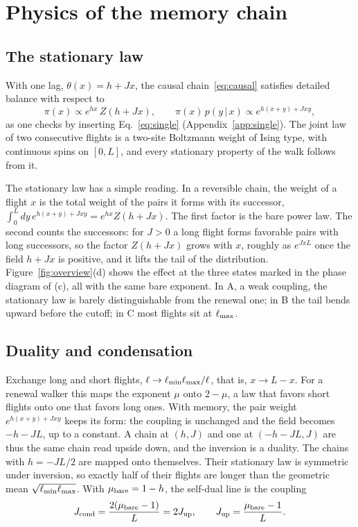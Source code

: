 \section{Physics of the memory chain}\label{sec:statmech}

\subsection{The stationary law}\label{sec:stationary}

With one lag, $\theta(x)=h+Jx$, the causal chain~\eqref{eq:causal} satisfies detailed balance with respect to
\begin{equation}
\pi(x)\propto e^{hx}\,Z(h+Jx),\qquad \pi(x)\,p(y\,|\,x)\propto e^{h(x+y)+Jxy},
\label{eq:stationary}
\end{equation}
as one checks by inserting Eq.~\eqref{eq:single} (Appendix~\ref{app:single}). The joint law of two consecutive flights is a two-site Boltzmann weight of Ising type, with continuous spins on $[0,L]$, and every stationary property of the walk follows from it.

The stationary law has a simple reading. In a reversible chain, the weight of a flight $x$ is the total weight of the pairs it forms with its successor, $\int_0^Ldy\,e^{h(x+y)+Jxy}=e^{hx}Z(h+Jx)$. The first factor is the bare power law. The second counts the successors: for $J>0$ a long flight forms favorable pairs with long successors, so the factor $Z(h+Jx)$ grows with $x$, roughly as $e^{JxL}$ once the field $h+Jx$ is positive, and it lifts the tail of the distribution. Figure~\ref{fig:overview}(d) shows the effect at the three states marked in the phase diagram of (c), all with the same bare exponent. In A, a weak coupling, the stationary law is barely distinguishable from the renewal one; in B the tail bends upward before the cutoff; in C most flights sit at $\ell_{\max}$.

\subsection{Duality and condensation}\label{sec:condensation}

Exchange long and short flights, $\ell\to\ell_{\min}\ell_{\max}/\ell$, that is, $x\to L-x$. For a renewal walker this maps the exponent $\mu$ onto $2-\mu$, a law that favors short flights onto one that favors long ones. With memory, the pair weight $e^{h(x+y)+Jxy}$ keeps its form: the coupling is unchanged and the field becomes $-h-JL$, up to a constant. A chain at $(h,J)$ and one at $(-h-JL,J)$ are thus the same chain read upside down, and the inversion is a duality. The chains with $h=-JL/2$ are mapped onto themselves. Their stationary law is symmetric under inversion, so exactly half of their flights are longer than the geometric mean $\sqrt{\ell_{\min}\ell_{\max}}$. With $\mu_{\rm bare}=1-h$, the self-dual line is the coupling
\begin{equation}
J_{\rm cond}=\frac{2(\mu_{\rm bare}-1)}{L}=2J_{\rm up},\qquad J_{\rm up}=\frac{\mu_{\rm bare}-1}{L}.
\label{eq:thresholds}
\end{equation}

